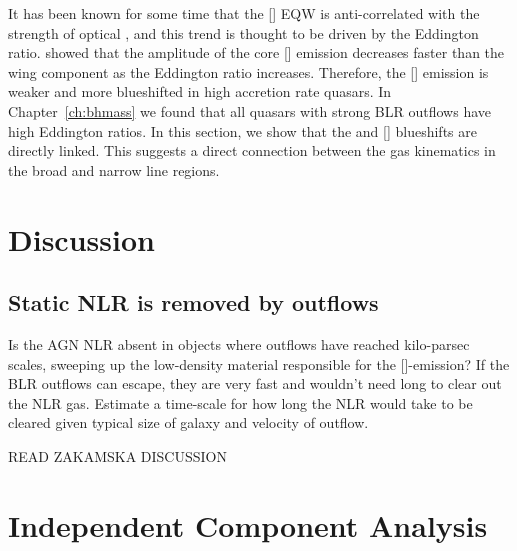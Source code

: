 It has been known for some time that the [] EQW is anti-correlated with the strength of optical , and this trend is thought to be driven by the Eddington ratio. 
\citet{shen14} showed that the amplitude of the core [] emission decreases faster than the wing component as the Eddington ratio increases. 
Therefore, the [] emission is weaker and more blueshifted in high accretion rate quasars.  
In Chapter~\ref{ch:bhmass} we found that all quasars with strong BLR outflows have high Eddington ratios. 
In this section, we show that the  and [] blueshifts are directly linked. 
This suggests a direct connection between the gas kinematics in the broad and narrow line regions. 


\section{Discussion}

\subsection{Static NLR is removed by outflows}

Is the AGN NLR absent in objects where outflows have reached kilo-parsec scales, sweeping up the low-density material responsible for the []-emission?
If the BLR outflows can escape, they are very fast and wouldn't need long to clear out the NLR gas. 
Estimate a time-scale for how long the NLR would take to be cleared given typical size of galaxy and velocity of outflow. 

READ ZAKAMSKA DISCUSSION

\section{Independent Component Analysis}

